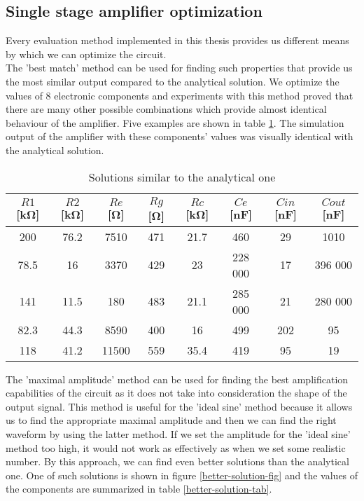 \subsection{Single stage amplifier optimization} \label{single-stage-results}
Every evaluation method implemented in this thesis provides us different means by which we can optimize the circuit.\\
The 'best match' method can be used for finding such properties that provide us the most similar output compared to the analytical solution. We optimize the values of 8 electronic components and experiments with this method proved that there are many other possible combinations which provide almost identical behaviour of the amplifier. Five examples are shown in table \ref{best-fit-solutions}. The simulation output of the amplifier with these components' values was visually identical with the analytical solution.\\

\begin{table}[H]
\centering
\begin{tabular}{@{}c ccccccc@{}}
\toprule
    $R1$ [\si{\kilo\ohm}] & $R2$ [\si{\kilo\ohm}] & $Re$ [\si{\ohm}] & $Rg$ [\si{\ohm}] & $Rc$ [\si{\kilo\ohm}] & $Ce$ [\si{\nano\farad}] & $Cin$ [\si{\nano\farad}] & $Cout$ [\si{\nano\farad}] \\
    \midrule
    200   & 76.2 & 7510  & 471 & 21.7 & 460     & 29    & 1010 \\
    78.5  & 16   & 3370  & 429 & 23   & 228 000 & 17    & 396 000 \\
    141   & 11.5 & 180   & 483 & 21.1 & 285 000 & 21    & 280 000 \\
    82.3  & 44.3 & 8590  & 400 & 16   & 499     & 202   & 95 \\
    118   & 41.2 & 11500 & 559 & 35.4 & 419     & 95    & 19 \\
    \bottomrule
\end{tabular}
\caption{Solutions similar to the analytical one}
\label{best-fit-solutions}
\end{table}

The 'maximal amplitude' method can be used for finding the best amplification capabilities of the circuit as it does not take into consideration the shape of the output signal. This method is useful for the 'ideal sine' method because it allows us to find the appropriate maximal amplitude and then we can find the right waveform by using the latter method. If we set the amplitude for the 'ideal sine' method too high, it would not work as effectively as when we set some realistic number. By this approach, we can find even better solutions than the analytical one. One of such solutions is shown in figure \ref{better-solution-fig} and the values of the components are summarized in table \ref{better-solution-tab}.\\

